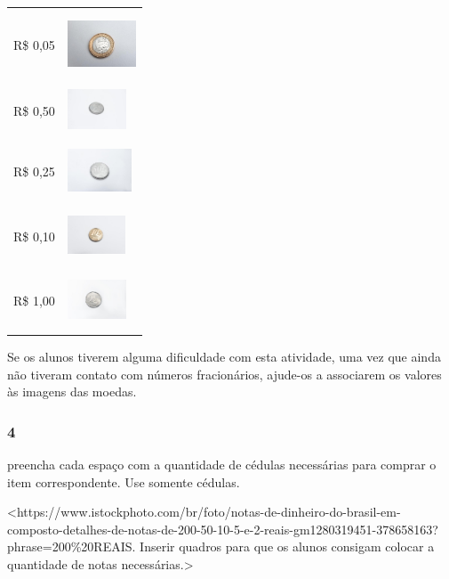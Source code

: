 \begin{longtable}[]{@{}ll@{}}
\toprule
R\$ 0,05 &
\includegraphics[width=0.80577in,height=0.79447in]{media/image60.jpg}\tabularnewline
R\$ 0,50 &
\includegraphics[width=0.69145in,height=0.53632in]{media/image61.jpg}\tabularnewline
R\$ 0,25 &
\includegraphics[width=0.75523in,height=0.67928in]{media/image62.jpg}\tabularnewline
R\$ 0,10 &
\includegraphics[width=0.67617in,height=0.63139in]{media/image63.jpg}\tabularnewline
R\$ 1,00 &
\includegraphics[width=0.69044in,height=0.66964in]{media/image64.jpg}\tabularnewline
\bottomrule
\end{longtable}

Se os alunos tiverem alguma dificuldade com esta atividade,
uma vez que ainda não tiveram contato com números fracionários, ajude-os
a associarem os valores às imagens das moedas.

\subsubsection{4}\label{section-57}

preencha cada espaço com a quantidade de cédulas necessárias para comprar o item correspondente. Use somente cédulas.

\textless{}https://www.istockphoto.com/br/foto/notas-de-dinheiro-do-brasil-em-composto-detalhes-de-notas-de-200-50-10-5-e-2-reais-gm1280319451-378658163?phrase=200\%20REAIS.
Inserir quadros para que os alunos consigam colocar a quantidade de
notas necessárias.\textgreater{}


